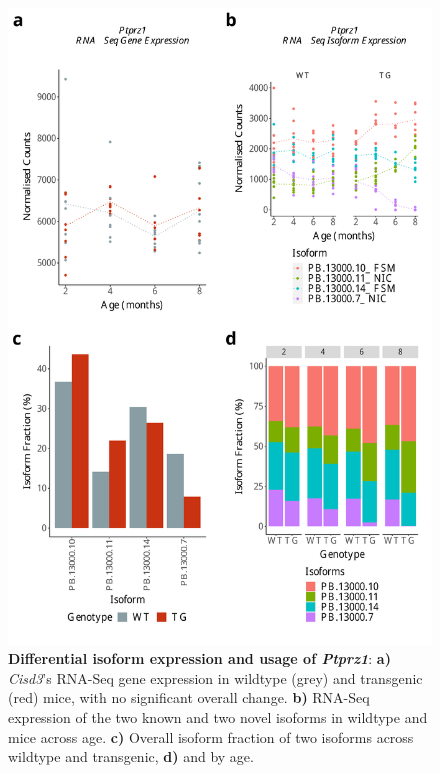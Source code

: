 

\begin{figure}[htp]
	\begin{center}
		\includegraphics[page=1,scale = 0.55]{Figures/DIU_notDEG_nomajor.pdf}
	\end{center}
	\captionsetup{width=0.95\textwidth}
	\caption[Differential isoform expression and usage of \textit{Ptprz1}]%
	{\textbf{Differential isoform expression and usage of \textit{Ptprz1}}: \textbf{a)} \textit{Cisd3}'s RNA-Seq gene expression in wildtype (grey) and transgenic (red) mice, with no significant overall change. \textbf{b)} RNA-Seq expression of the two known and two novel isoforms in wildtype and mice across age. \textbf{c)} Overall isoform fraction of two isoforms across wildtype and transgenic, \textbf{d)} and by age.}    
	\label{fig:DIU_ptprz1}
\end{figure}


